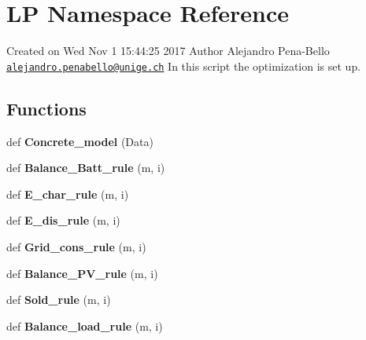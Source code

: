 \hypertarget{namespace_l_p}{}\section{LP Namespace Reference}
\label{namespace_l_p}


Created on Wed Nov 1 15\+:44\+:25 2017 Author Alejandro Pena-\/\+Bello \href{mailto:alejandro.penabello@unige.ch}{\tt alejandro.\+penabello@unige.\+ch} In this script the optimization is set up.  


\subsection*{Functions}
\begin{DoxyCompactItemize}
\item 
\mbox{\label{namespace_l_p_aff8a41d69b2aa8c8092b2aedd2eb3df6}} 
def {\bfseries Concrete\+\_\+model} (Data)
\item 
\mbox{\label{namespace_l_p_a4dc6c0a11259a3e6c48c358aec140385}} 
def {\bfseries Balance\+\_\+\+Batt\+\_\+rule} (m, i)
\item 
\mbox{\label{namespace_l_p_aac61ce084b61fa22a2546dafc494bcb0}} 
def {\bfseries E\+\_\+char\+\_\+rule} (m, i)
\item 
\mbox{\label{namespace_l_p_ab78ac81e78bfa9c6a030d20f4422d4ab}} 
def {\bfseries E\+\_\+dis\+\_\+rule} (m, i)
\item 
\mbox{\label{namespace_l_p_a0aaf8565592895b8afeffcd33c6452c7}} 
def {\bfseries Grid\+\_\+cons\+\_\+rule} (m, i)
\item 
\mbox{\label{namespace_l_p_aaa5c98af22d032fe4789fbf07ff0f7fb}} 
def {\bfseries Balance\+\_\+\+P\+V\+\_\+rule} (m, i)
\item 
\mbox{\label{namespace_l_p_a1b5e92f8502a9cbcd92198d9857a6d83}} 
def {\bfseries Sold\+\_\+rule} (m, i)
\item 
\mbox{\label{namespace_l_p_a7995ecb2641ea88b0911ec2aeca541ca}} 
def {\bfseries Balance\+\_\+load\+\_\+rule} (m, i)
\item 
\mbox{\label{namespace_l_p_a063633601bec91a8e0bf87f9bb0aa6ab}} 

\end{DoxyCompactItemize}
